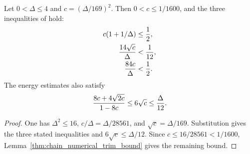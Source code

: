 \begin{lemma}
    \label{thm:chain_numerical_trim_constant}
    \leanok
    Let $0<\Delta\le4$ and $c=(\Delta/169)^2$. Then $0<c\le1/1600$,
    and the three inequalities of
    \cite[source lines 290--293]{Landau2015Polynomial}
    hold:
    \begin{align}
        c(1+1/\Delta)            & \le\frac12,\notag  \\
        \frac{14\sqrt c}{\Delta} & <\frac1{12},\notag \\
        \frac{84c}{\Delta}       & <\frac12. \notag
    \end{align}
    The energy estimates also satisfy
    \begin{align}
        \frac{8c+4\sqrt{2c}}{1-8c}\le6\sqrt c\le\frac{\Delta}{12}. \notag
    \end{align}
\end{lemma}
\begin{proof}\leanok
    One has $\Delta^2\le16$, $c/\Delta=\Delta/28561$, and
    $\sqrt c=\Delta/169$. Substitution gives the three stated inequalities
    and $6\sqrt c\le\Delta/12$. Since $c\le16/28561<1/1600$,
    Lemma~\ref{thm:chain_numerical_trim_bound} gives the remaining bound.
\end{proof}
